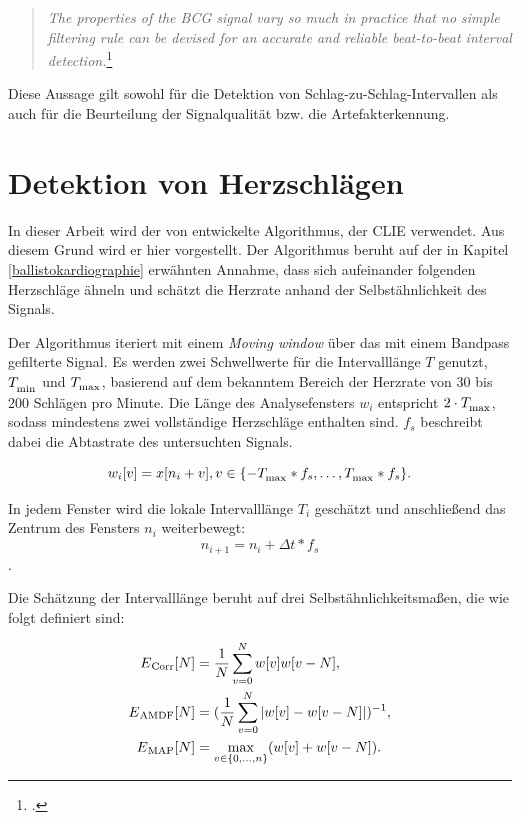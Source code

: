 	\begin{quote}\textit{The properties of the BCG signal vary so much in practice that no simple filtering rule can be devised for an accurate and reliable beat-to-beat interval detection.}\footcite{Paalasmaa2015}\end{quote}
	
	Diese Aussage gilt sowohl für die Detektion von Schlag-zu-Schlag-Intervallen als auch für die Beurteilung der Signalqualität bzw. die Artefakterkennung.

\section{Detektion von Herzschlägen}\label{CLIE}

	In dieser Arbeit wird der von \citeauthor{Bruser2013} entwickelte Algorithmus, der \acf{CLIE} verwendet. Aus diesem Grund wird er hier vorgestellt. Der Algorithmus beruht auf der in Kapitel \ref{ballistokardiographie} erwähnten Annahme, dass sich aufeinander folgenden Herzschläge ähneln und schätzt die Herzrate anhand der Selbstähnlichkeit des Signals.


	Der Algorithmus iteriert mit einem \textit{Moving window} über das mit einem Bandpass gefilterte Signal. Es werden zwei Schwellwerte für die Intervalllänge $T$ genutzt, $T_\textsubscript{min}$ und $T_\textsubscript{max}$, basierend auf dem bekanntem Bereich der Herzrate von 30 bis 200 Schlägen pro Minute. Die Länge des Analysefensters $w_i$ entspricht $2 \cdot T_\textsubscript{max}$, sodass mindestens zwei vollständige Herzschläge enthalten sind. $f_s$ beschreibt dabei die Abtastrate des untersuchten Signals.
	
	\[ %
		w_i[v] = x[n_i + v], v \in \{ -T_\textsubscript{max} * f_s, \ldots, T_\textsubscript{max} * f_s\}\text{.}
	\]
	
	In jedem Fenster wird die lokale Intervalllänge $T_i$ geschätzt und anschließend das Zentrum des Fensters $n_i$ weiterbewegt: \[ n_{i+1} = n_i + \Delta t * f_s \].
	
	Die Schätzung der Intervalllänge beruht auf drei Selbstähnlichkeitsmaßen, die wie folgt definiert sind:
	
	\begin{align*}
		E\textsubscript{Corr}[N] &= \frac{1}{N} \sum_{v=0}^{N} w[v]w[v-N],\\
		E\textsubscript{AMDF}[N] &= (\frac{1}{N} \sum_{v=0}^{N} |w[v]-w[v-N]|)^{-1},\\
		E\textsubscript{MAP}[N] &= \max_{v \in \{0,...,n\}}(w[v]+w[v-N]).
	\end{align*}
 	
